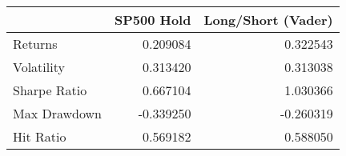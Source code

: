 \begin{tabular}{lrr}
\toprule
{} &  SP500 Hold &  Long/Short (Vader) \\
\midrule
Returns      &    0.209084 &            0.322543 \\
Volatility   &    0.313420 &            0.313038 \\
Sharpe Ratio &    0.667104 &            1.030366 \\
Max Drawdown &   -0.339250 &           -0.260319 \\
Hit Ratio    &    0.569182 &            0.588050 \\
\bottomrule
\end{tabular}
